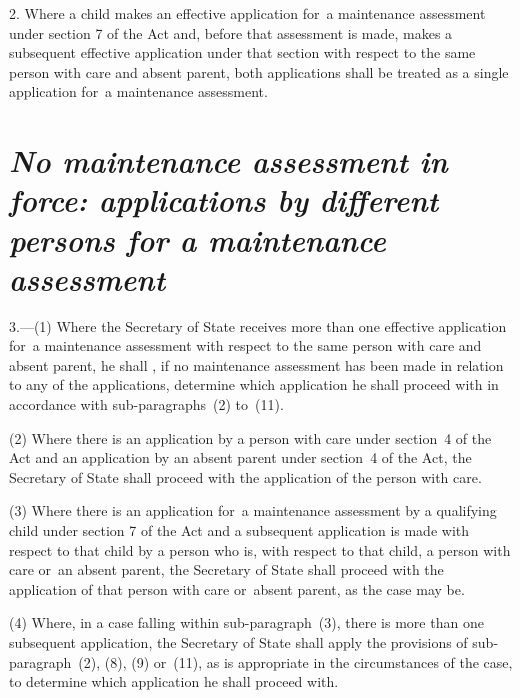 \documentclass[a4paper,12pt]{article}
\begin{document}
2.  Where a child makes an effective application for~a maintenance assessment under section 7 of the Act and, before that assessment is made, makes a subsequent effective application under that section with respect to the same person with care and absent parent, both applications shall be treated as a single application for~a maintenance assessment.

\section*{\itshape\sloppy No maintenance assessment in force: applications by different persons for a maintenance assessment}

3.—(1) Where the Secretary of State receives more than one effective application for~a maintenance assessment with respect to the same person with care and absent parent, he shall%
, if no maintenance assessment has been made in relation to any of the applications,  %
determine which application he shall proceed with in accordance with sub-paragraphs~(2) to~(11).

(2) Where there is an application by a person with care under section~4 
of the Act and an application by an absent parent under section~4 of the Act, 
the Secretary of State  %
shall proceed with the application of the person with care.

(3) Where there is an application for~a maintenance assessment by a qualifying child under section 7 of the Act and a subsequent application is made with respect to that child by a person who is, with respect to that child, a person with care or~an absent parent, 
the Secretary of State  %
shall proceed with the application of that person with care or~absent parent, as the case may be.

(4) Where, in a case falling within sub-paragraph~(3), there is more than one subsequent application, 
the Secretary of State  %
shall apply the provisions of sub-paragraph~(2), (8), (9) or~(11), as is appropriate in the circumstances of the case, to determine which application he shall proceed with.
\end{document}
